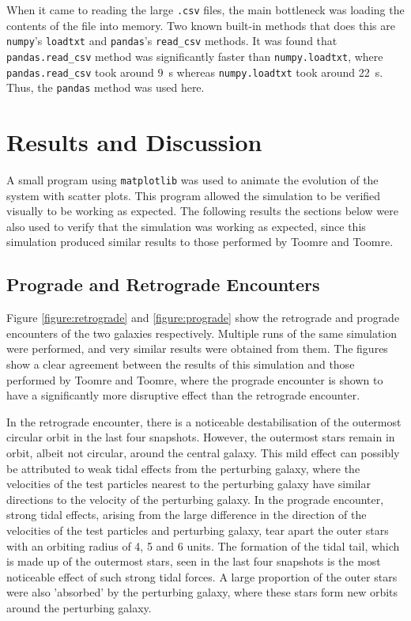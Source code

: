 \documentclass[twoside,twocolumn]{article}
\begin{document}
        When it came to reading the large \texttt{.csv} files, the main bottleneck was loading the contents of the file into memory. Two known built-in methods that does this are \texttt{numpy}'s \texttt{loadtxt} and \texttt{pandas}'s \texttt{read\_csv} methods. It was found that \texttt{pandas.read\_csv} method was significantly faster than \texttt{numpy.loadtxt}, where \texttt{pandas.read\_csv} took around \SI{9}{\second} whereas \texttt{numpy.loadtxt} took around \SI{22}{\second}. Thus, the \texttt{pandas} method was used here.

        
\section{Results and Discussion}

    A small program using \texttt{matplotlib} was used to animate the evolution of the system with scatter plots. This program allowed the simulation to be verified visually to be working as expected. The following results the sections below were also used to verify that the simulation was working as expected, since this simulation produced similar results to those performed by Toomre and Toomre.
    

\subsection{Prograde and Retrograde Encounters}

        Figure \ref{figure:retrograde} and \ref{figure:prograde} show the retrograde and prograde encounters of the two galaxies respectively. Multiple runs of the same simulation were performed, and very similar results were obtained from them. The figures show a clear agreement between the results of this simulation and those performed by Toomre and Toomre, where the prograde encounter is shown to have a significantly more disruptive effect than the retrograde encounter. 
        
        In the retrograde encounter, there is a noticeable destabilisation of the outermost circular orbit in the last four snapshots. However, the outermost stars remain in orbit, albeit not circular, around the central galaxy. This mild effect can possibly be attributed to weak tidal effects from the perturbing galaxy, where the velocities of the test particles nearest to the perturbing galaxy have similar directions to the velocity of the perturbing galaxy.  In the prograde encounter, strong tidal effects, arising from the large difference in the direction of the velocities of the test particles and perturbing galaxy, tear apart the outer stars with an orbiting radius of 4, 5 and 6 units. The formation of the tidal tail, which is made up of the outermost stars, seen in the last four snapshots is the most noticeable effect of such strong tidal forces. A large proportion of the outer stars were also 'absorbed' by the perturbing galaxy, where these stars form new orbits around the perturbing galaxy.
\end{document}
